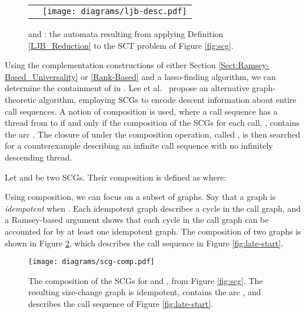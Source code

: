 \documentclass{LMCS}
\begin{document}
\begin{figure}[tb]
\begin{center}
\begin{tabular}{cc}
\raisebox{0.3in}{{
{\texttt{[image: diagrams/flow.pdf]}}
}}
\hspace{0.25in}
&
\hspace{0.25in}
{
{\texttt{[image: diagrams/ljb-desc.pdf]}}
}
\end{tabular}
\end{center}
\caption{ and : the automata resulting from applying Definition
\ref{LJB_Reduction} to the SCT problem of Figure \ref{fig:scg}.}
\label{fig:ljb-desc}
\end{figure}

Using the complementation constructions of either Section
\ref{Sect:Ramsey-Based_Universality} or \ref{Rank-Based} and a lasso-finding
algorithm,  we can determine the containment of  in
. Lee et al.~ propose an alternative graph-theoretic algorithm,
employing SCGs to encode descent information about entire call sequences.  A
notion of composition is used, where a call sequence  has a
thread from  to  if and only if the composition of the SCGs for each call,
, contains the arc . The closure of
 under the composition operation, called ,  is then searched for a
counterexample describing an infinite call sequence with no infinitely
descending thread.


\begin{defi} 
Let  and  be two SCGs.
Their composition  is defined as  where:

\end{defi}


Using composition, we can focus on a subset of graphs. Say that a graph  is
\emph{idempotent} when . Each idempotent graph describes a cycle in the call graph, and a
Ramsey-based argument shows that each cycle in the call graph can be accounted for by at least one
idempotent graph. The composition of two graphs is shown in Figure \ref{fig:scg-comp}, which
describes the call sequence in Figure \ref{fig:late-start}.

\begin{figure}[tb]
\begin{center}
{\texttt{[image: diagrams/scg-comp.pdf]}}
\end{center}
\caption{The composition of the SCGs for  and , from Figure \ref{fig:scg}. The
resulting size-change graph is idempotent, contains the arc , and
describes the call sequence of Figure \ref{fig:late-start}.}
\label{fig:scg-comp}
\end{figure}
\end{document}
